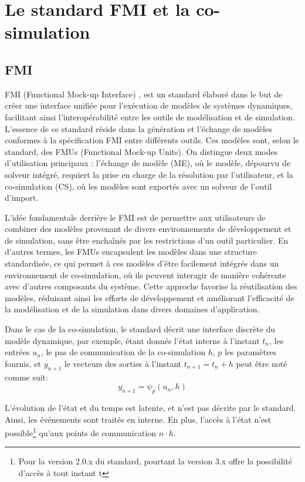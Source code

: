 \section{Le standard FMI et la co-simulation}\label{sec:2}
\subsection{FMI}
FMI (Functional Mock-up Interface) \cite{b6}, est un standard élaboré dans le but de créer une interface unifiée pour l'exécution de modèles de systèmes dynamiques, facilitant ainsi l'interopérabilité entre les outils de modélisation et de simulation. L'essence de ce standard réside dans la génération et l'échange de modèles conformes à la spécification FMI entre différents outils. Ces modèles sont, selon le standard, des FMUs (Functional Mock-up Units). 
On distingue deux modes d'utilisation principaux : l'échange de modèle (ME), où le modèle, dépourvu de solveur intégré, requiert la prise en charge de la résolution par l'utilisateur, et la co-simulation (CS), où les modèles sont exportés avec un solveur de l'outil d'import.

L'idée fondamentale derrière le FMI est de permettre aux utilisateurs de combiner des modèles provenant de divers environnements de développement et de simulation, sans être enchaînés par les restrictions d'un outil particulier. En d'autres termes, les FMUs encapsulent les modèles dans une structure standardisée, ce qui permet à ces modèles d'être facilement intégrés dans un environnement de co-simulation, où ils peuvent interagir de manière cohérente avec d'autres composants du système. Cette approche favorise la réutilisation des modèles, réduisant ainsi les efforts de développement et améliorant l'efficacité de la modélisation et de la simulation dans divers domaines d'application.

Dans le cas de la co-simulation, le standard décrit une interface discrète du modèle dynamique, par exemple, étant donnés l'état interne à l'instant $t_n$, les entrées $u_n$, le pas de communication de la co-simulation $h$, $p$ les paramètres fournis, et $y_{n+1}$ le vecteurs des sorties à l'instant $t_{n+1}= t_n + h$ peut être noté comme suit: 
\begin{equation}
    y_{n+1} = \psi_p (u_n,h)
\end{equation}

L'évolution de l'état et du temps est latente, et n'est pas décrite par le standard. Ainsi, les événements sont traités en interne. En plus, l'accès à l'état n'est possible\footnote{Pour la version 2.0.x du standard, pourtant la version 3.x offre la possibilité d'accès à tout instant t} qu'aux points de communication $n\cdot h$.

